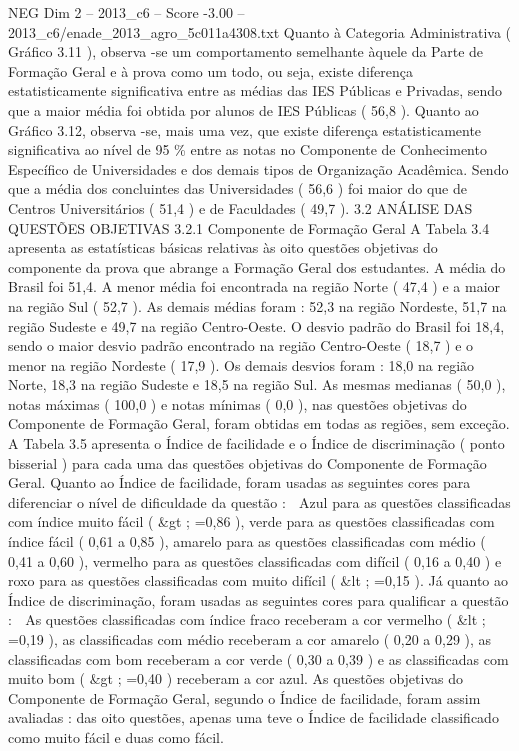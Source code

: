 \begin{textsample}{NEG Dim 2 – 2013\_c6 – Score -3.00 – 2013\_c6/enade\_2013\_agro\_5c011a4308.txt}
Quanto à Categoria Administrativa ( Gráfico 3.11 ), observa -se um comportamento semelhante àquele da Parte de Formação Geral e à prova como um todo, ou seja, existe diferença estatisticamente significativa entre as médias das IES Públicas e Privadas, sendo que a maior média foi obtida por alunos de IES Públicas ( 56,8 ).
Quanto ao Gráfico 3.12, observa -se, mais uma vez, que existe diferença estatisticamente significativa ao nível de 95 \% entre as notas no Componente de Conhecimento Específico de Universidades e dos demais tipos de Organização Acadêmica.
Sendo que a média dos concluintes das Universidades ( 56,6 ) foi maior do que de Centros Universitários ( 51,4 ) e de Faculdades ( 49,7 ). 3.2 ANÁLISE DAS QUESTÕES OBJETIVAS 3.2.1 Componente de Formação Geral A Tabela 3.4 apresenta as estatísticas básicas relativas às oito questões objetivas do componente da prova que abrange a Formação Geral dos estudantes.
A média do Brasil foi 51,4.
A menor média foi encontrada na região Norte ( 47,4 ) e a maior na região Sul ( 52,7 ).
As demais médias foram : 52,3 na região Nordeste, 51,7 na região Sudeste e 49,7 na região Centro-Oeste.
O desvio padrão do Brasil foi 18,4, sendo o maior desvio padrão encontrado na região Centro-Oeste ( 18,7 ) e o menor na região Nordeste ( 17,9 ).
Os demais desvios foram : 18,0 na região Norte, 18,3 na região Sudeste e 18,5 na região Sul.
As mesmas medianas ( 50,0 ), notas máximas ( 100,0 ) e notas mínimas ( 0,0 ), nas questões objetivas do Componente de Formação Geral, foram obtidas em todas as regiões, sem exceção.
A Tabela 3.5 apresenta o Índice de facilidade e o Índice de discriminação ( ponto bisserial ) para cada uma das questões objetivas do Componente de Formação Geral.
Quanto ao Índice de facilidade, foram usadas as seguintes cores para diferenciar o nível de dificuldade da questão :  Azul para as questões classificadas com índice muito fácil ( \&gt ; =0,86 ), verde para as questões classificadas com índice fácil ( 0,61 a 0,85 ), amarelo para as questões classificadas com médio ( 0,41 a 0,60 ), vermelho para as questões classificadas com difícil ( 0,16 a 0,40 ) e roxo para as questões classificadas com muito difícil ( \&lt ; =0,15 ).
Já quanto ao Índice de discriminação, foram usadas as seguintes cores para qualificar a questão :  As questões classificadas com índice fraco receberam a cor vermelho ( \&lt ; =0,19 ), as classificadas com médio receberam a cor amarelo ( 0,20 a 0,29 ), as classificadas com bom receberam a cor verde ( 0,30 a 0,39 ) e as classificadas com muito bom ( \&gt ; =0,40 ) receberam a cor azul.
As questões objetivas do Componente de Formação Geral, segundo o Índice de facilidade, foram assim avaliadas : das oito questões, apenas uma teve o Índice de facilidade classificado como muito fácil e duas como fácil.

\end{textsample}
